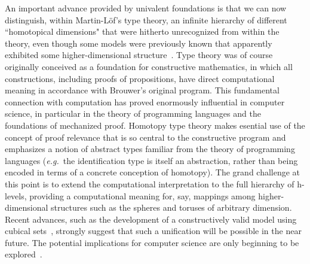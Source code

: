\documentclass[11pt]{article}
\theoremstyle{remark}
\theoremstyle{definition}
\begin{document}
An important advance provided by univalent foundations is that we can now distinguish, within Martin-L\"{o}f's type
theory, an infinite hierarchy of different ``homotopical dimensions" that were hitherto unrecognized from within the
theory, even though some models were previously known that apparently exhibited some higher-dimensional
structure~\cite{hofmann-streicher}.  Type theory was of course originally conceived as a foundation for constructive
mathematics, in which all constructions, including proofs of propositions, have direct computational meaning in
accordance with Brouwer's original program.  This fundamental connection with computation has proved enormously
influential in computer science, in particular in the theory of programming languages and the foundations of mechanized
proof.  Homotopy type theory makes esential use of the concept of proof relevance that is so central to the constructive
program and emphasizes a notion of abstract types familiar from the theory of programming languages (\textit{e.g.}\ the
identification type is itself an abstraction, rather than being encoded in terms of a concrete conception of homotopy).
The grand challenge at this point is to extend the computational interpretation to the full hierarchy of h-levels,
providing a computational meaning for, say, mappings among higher-dimensional structures such as the spheres and toruses
of arbitrary dimension.  Recent advances, such as the development of a constructively valid model using cubical
sets~\cite{bch}, strongly suggest that such a unification will be possible in the near future.  The potential
implications for computer science are only beginning to be explored~\cite{patch-theory}.
%
\end{document}

